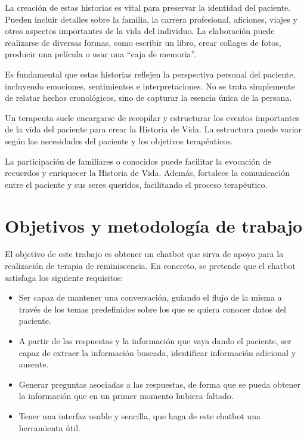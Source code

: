 La creación de estas historias es vital para preservar la identidad del paciente. Pueden incluir detalles sobre la familia, la carrera profesional, aficiones, viajes y otros aspectos importantes de la vida del individuo. La elaboración puede realizarse de diversas formas, como escribir un libro, crear collages de fotos, producir una película o usar una ``caja de memoria''.

Es fundamental que estas historias reflejen la perspectiva personal del paciente, incluyendo emociones, sentimientos e interpretaciones. No se trata simplemente de relatar hechos cronológicos, sino de capturar la esencia única de la persona.

Un terapeuta suele encargarse de recopilar y estructurar los eventos importantes de la vida del paciente para crear la Historia de Vida. La estructura puede variar según las necesidades del paciente y los objetivos terapéuticos.

La participación de familiares o conocidos puede facilitar la evocación de recuerdos y enriquecer la Historia de Vida. Además, fortalece la comunicación entre el paciente y sus seres queridos, facilitando el proceso terapéutico.

\section{Objetivos y metodología de trabajo}
\label{sec:objetivos}

El objetivo de este trabajo es obtener un chatbot que sirva de apoyo para la realización de terapia de reminiscencia. En concreto, se pretende que el chatbot satisfaga los siguiente requisitos: 

\begin{itemize}
	\item  Ser capaz de mantener una conversación, guiando el flujo de la misma a través de los temas predefinidos sobre los que se quiera conocer datos del paciente. 
	\item A partir de las respuestas y la información que vaya dando el paciente, ser capaz de extraer la información buscada, identificar información adicional y ausente.
	\item Generar preguntas asociadas a las respuestas, de forma que se pueda obtener la información que en un primer momento hubiera faltado. 
	\item Tener una interfaz usable y sencilla, que haga de este chatbot una herramienta útil.
\end{itemize}

